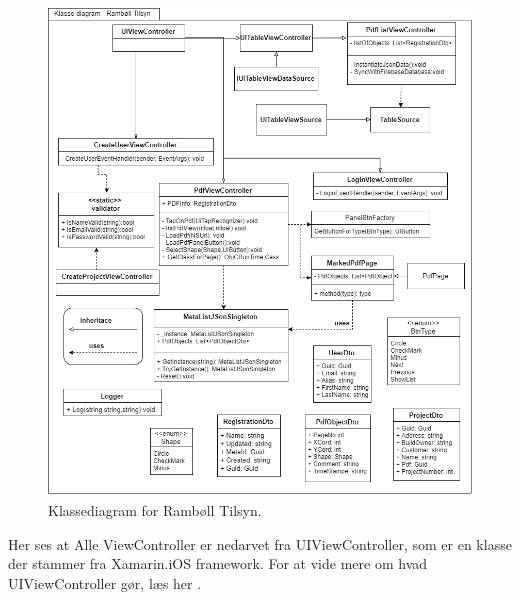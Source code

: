 \begin{figure}[H] %
	\centering
	\includegraphics[height=13cm, width=17cm]{../ArkitekturDesign/OverordnetArkitektur/KlasseDiagram}
	\caption{Klassediagram for Rambøll Tilsyn.}
	\label{fig:KlasseDiagram}
\end{figure}

Her ses at Alle ViewController er nedarvet fra UIViewController, som er en klasse der stammer fra Xamarin.iOS framework. For at vide mere om hvad UIViewController gør, læs her \cite{UIViewController}.  